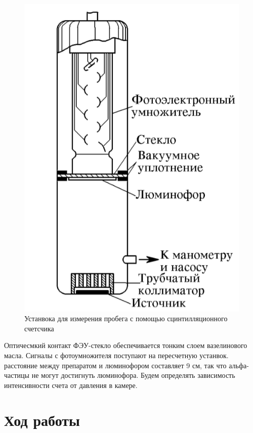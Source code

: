 \documentclass[a4paper]{article}
\begin{document}
\begin{figure}[H]
    \begin{center}
    \includegraphics[scale = 0.8]{scin.png}
    \caption{Устанвока для измерения пробега с помощью сцинтилляционного счетсчика}
    \label{scin}
    \end{center}
\end{figure}
 
Оптичесмкий контакт ФЭУ-стекло обеспечивается тонким слоем вазелинового масла. Сигналы с фотоумножителя поступают на пересчетную устанвок. 
расстояние между препаратом и люминофором составляет 9 см, так что альфа-частицы не могут достигнуть 
люминофора. Будем определять зависимость интенсивности счета от давления в камере. 


\section{Ход работы}
\end{document}
